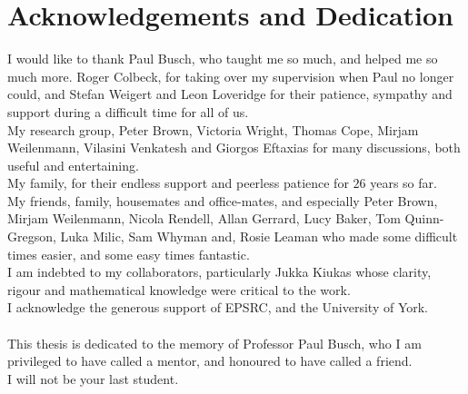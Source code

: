 
\chapter*{Acknowledgements and Dedication}
\setcounter{page}{11}

I would like to thank Paul Busch, who taught me so much, and helped me so much more. Roger Colbeck, for taking over my supervision when Paul no longer could, and Stefan Weigert and Leon Loveridge for their patience, sympathy and support during a difficult time for all of us.\\
My research group, Peter Brown, Victoria Wright, Thomas Cope, Mirjam Weilenmann, Vilasini Venkatesh and Giorgos Eftaxias for many discussions, both useful and entertaining.\\
My family, for their endless support and peerless patience for $26$ years so far.\\
My friends, family, housemates and office-mates, and especially Peter Brown, Mirjam Weilenmann, Nicola Rendell, Allan Gerrard, Lucy Baker, Tom Quinn-Gregson, Luka Milic, Sam Whyman and, Rosie Leaman who made some difficult times easier, and some easy times fantastic.\\
I am indebted to my collaborators, particularly Jukka Kiukas whose clarity, rigour and mathematical knowledge were critical to the work.\\
I acknowledge the generous support of EPSRC, and the University of York.\\ \\
This thesis is dedicated to the memory of Professor Paul Busch, who I am privileged to have called a mentor, and honoured to have called a friend. \\I will not be your last student.



\clearpage 